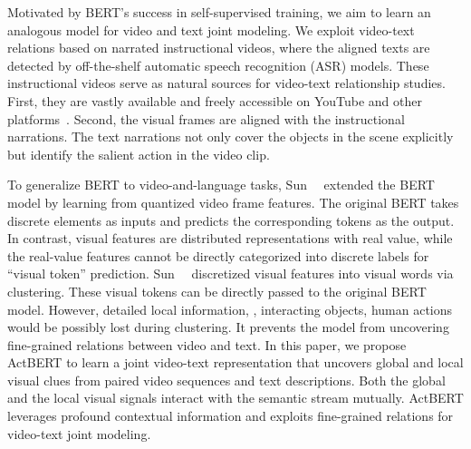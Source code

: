 \documentclass[10pt,twocolumn,letterpaper]{article}
\newcommand{\ours}{ActBERT\xspace}
\begin{document}
Motivated by BERT's success in self-supervised training, we aim to learn an analogous model for video and text joint modeling.
We exploit video-text relations based on narrated instructional videos, where the aligned texts are detected by off-the-shelf automatic speech recognition (ASR) models.
These instructional videos serve as natural sources for video-text relationship studies. First, they are vastly available and freely accessible on YouTube and other platforms~\cite{miech2019howto100m,sun2019videobert}. Second, the visual frames are aligned with the instructional narrations. The text narrations not only cover the objects in the scene explicitly but identify the salient action in the video clip.


To generalize BERT to video-and-language tasks, Sun~\etal~\cite{sun2019videobert} extended the BERT model by learning from quantized video frame features.
The original BERT takes discrete elements as inputs and predicts the corresponding tokens as the output. In contrast, visual features are distributed representations with real value, while the real-value features cannot be directly categorized into discrete labels for ``visual token'' prediction.  Sun~\etal~\cite{sun2019videobert} discretized visual features into visual words via clustering. These visual tokens can be directly passed to the original BERT model. 
However, detailed local information, \eg, interacting objects, human actions would be possibly lost during clustering. It prevents the model from uncovering fine-grained relations between video and text.
In this paper, we propose \ours to learn a joint video-text representation that uncovers global and local visual clues from paired video sequences and text descriptions.
Both the global and the local visual signals interact with the semantic stream mutually. \ours leverages profound contextual information and exploits fine-grained relations for video-text joint modeling.
\end{document}
